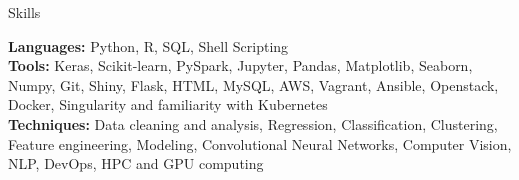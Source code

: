 \documentclass{resume} %
\begin{document}
  


\begin{rSection}{Skills} \itemsep -3pt  

{\textbf{Languages:} Python, R, SQL, Shell Scripting}  \\
{\textbf{Tools:} Keras, Scikit-learn, PySpark, Jupyter, Pandas, Matplotlib, Seaborn, Numpy, Git, Shiny, Flask, HTML, MySQL, AWS, Vagrant, Ansible, Openstack, Docker, Singularity and familiarity with Kubernetes} \\
{\textbf{Techniques:} Data cleaning and analysis, Regression, Classification, Clustering, Feature engineering, Modeling, Convolutional Neural Networks, Computer Vision, NLP, DevOps, HPC and GPU computing}
\end{rSection}  
 
\end{document}
